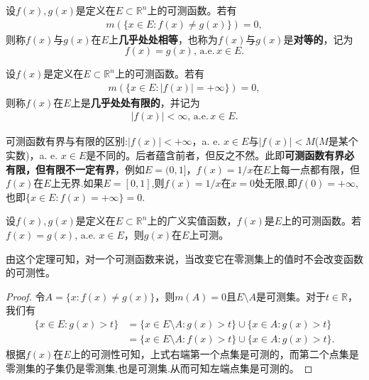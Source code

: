 \documentclass[../../main.tex]{subfiles}%
\begin{document}
\begin{definition}
设$f(x), g(x)$是定义在$E \subset \mathbb{R}^n$上的可测函数。若有
\begin{align*}
m(\{x \in E: f(x) \neq g(x)\}) = 0,
\end{align*}
则称$f(x)$与$g(x)$在$E$上\textbf{几乎处处相等}，也称为$f(x)$与$g(x)$是\textbf{对等的}，记为$$f(x) = g(x),\,\mathrm{a}.\mathrm{e}.\,x \in E.$$

设$f(x)$是定义在$E \subset \mathbb{R}^n$上的可测函数。若有
\begin{align*}
m(\{x \in E: |f(x)| = +\infty\}) = 0,
\end{align*}
则称$f(x)$在$E$上是\textbf{几乎处处有限的}，并记为
\begin{align*}
|f(x)| < \infty,\,\mathrm{a}.\mathrm{e}.\,x \in E.
\end{align*}
\end{definition}
\begin{remark}
可测函数有界与有限的区别:$|f(x)| < +\infty$，a. e. $x \in E$与$|f(x)| < M$($M$是某个实数)，a. e. $x \in E$是不同的。后者蕴含前者，但反之不然。此即\textbf{可测函数有界必有限，但有限不一定有界}，例如\(E = (0, 1]\)，\(f(x) = 1/x\)在\(E\)上每一点都有限，但\(f(x)\)在\(E\)上无界.如果$E=[0,1]$,则\(f(x) = 1/x\)在$x=0$处无限,即$f(0)=+\infty$,也即$\{x\in E:f(x)=+\infty\}={0}.$
\end{remark}

\begin{theorem}
设$f(x),g(x)$是定义在$E \subset \mathbb{R}^n$上的广义实值函数，$f(x)$是$E$上的可测函数。若$f(x) = g(x)$, a.e. $x \in E$，则$g(x)$在$E$上可测。
\end{theorem}
\begin{remark}
由这个定理可知，对一个可测函数来说，当改变它在零测集上的值时不会改变函数的可测性。 
\end{remark}
\begin{proof}
令$A = \{x: f(x) \neq g(x)\}$，则$m(A) = 0$且$E \setminus A$是可测集。对于$t \in \mathbb{R}$，我们有
\begin{align*}
\{x \in E: g(x) > t\} 
&= \{x \in E \setminus A: g(x) > t\} \cup \{x \in A: g(x) > t\} \\
&= \{x \in E \setminus A: f(x) > t\} \cup \{x \in A: g(x) > t\}.
\end{align*}
根据$f(x)$在$E$上的可测性可知，上式右端第一个点集是可测的，而第二个点集是零测集的子集仍是零测集,也是可测集.从而可知左端点集是可测的。
\end{proof}
\end{document}
